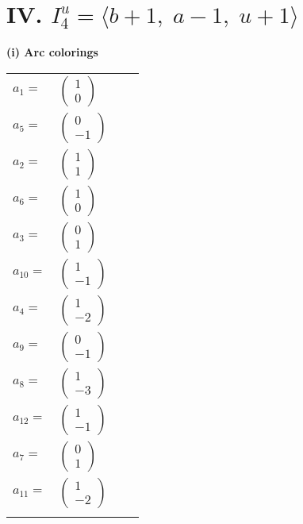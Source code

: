 \documentclass[1p]{elsarticle_modified}
\theoremstyle{definition}
\begin{document}
\centering \section*{IV. $I^u_{4}= \langle b+1,\;a-1,\;u+1 \rangle$}
\flushleft \textbf{(i) Arc colorings}\\
\begin{tabular}{m{7pt} m{180pt} m{7pt} m{180pt} }
\flushright $a_{1}=$&$\begin{pmatrix}1\\0\end{pmatrix}$ \\
\flushright $a_{5}=$&$\begin{pmatrix}0\\-1\end{pmatrix}$ \\
\flushright $a_{2}=$&$\begin{pmatrix}1\\1\end{pmatrix}$ \\
\flushright $a_{6}=$&$\begin{pmatrix}1\\0\end{pmatrix}$ \\
\flushright $a_{3}=$&$\begin{pmatrix}0\\1\end{pmatrix}$ \\
\flushright $a_{10}=$&$\begin{pmatrix}1\\-1\end{pmatrix}$ \\
\flushright $a_{4}=$&$\begin{pmatrix}1\\-2\end{pmatrix}$ \\
\flushright $a_{9}=$&$\begin{pmatrix}0\\-1\end{pmatrix}$ \\
\flushright $a_{8}=$&$\begin{pmatrix}1\\-3\end{pmatrix}$ \\
\flushright $a_{12}=$&$\begin{pmatrix}1\\-1\end{pmatrix}$ \\
\flushright $a_{7}=$&$\begin{pmatrix}0\\1\end{pmatrix}$ \\
\flushright $a_{11}=$&$\begin{pmatrix}1\\-2\end{pmatrix}$\\&\end{tabular}
\end{document}
